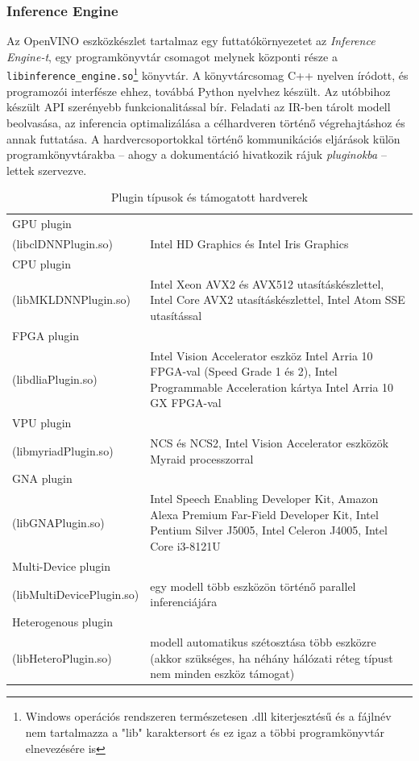 \subsubsection{Inference Engine}
Az OpenVINO eszközkészlet tartalmaz egy futtatókörnyezetet az \emph{Inference Engine-t}, egy programkönyvtár csomagot melynek központi része a \verb|libinference_engine.so|\footnote{Windows operációs rendszeren természetesen .dll kiterjesztésű és a fájlnév nem tartalmazza a "lib" karaktersort és ez igaz a többi programkönyvtár elnevezésére is} könyvtár. A könyvtárcsomag C++ nyelven íródott, és programozói interfésze ehhez, továbbá Python nyelvhez készült. Az utóbbihoz készült API szerényebb funkcionalitással bír. Feladati az IR-ben tárolt modell beolvasása, az inferencia optimalizálása a célhardveren történő végrehajtáshoz  és annak futtatása. A hardvercsoportokkal történő kommunikációs eljárások külön programkönyvtárakba -- ahogy a dokumentáció hivatkozik rájuk \emph{pluginokba} -- lettek szervezve.
\begin{table}[h]
	\centering
	\begin{tabular}{ p{} | p{} }
		GPU plugin\\(libclDNNPlugin.so)& Intel HD Graphics és Intel Iris Graphics  \\ \hline
		CPU plugin\\(libMKLDNNPlugin.so)& Intel Xeon AVX2 és AVX512 utasításkészlettel, Intel Core AVX2 utasításkészlettel, Intel Atom SSE utasítással \\ \hline
		FPGA plugin\\(libdliaPlugin.so)& Intel Vision Accelerator %
		eszköz Intel Arria 10 FPGA-val (Speed Grade 1 és 2), Intel Programmable Acceleration kártya Intel Arria 10 GX FPGA-val \\ \hline
		VPU plugin\\(libmyriadPlugin.so)& NCS és NCS2, Intel Vision Accelerator %
		eszközök Myraid processzorral\\ \hline
		GNA plugin\\(libGNAPlugin.so)& Intel Speech Enabling Developer Kit, Amazon Alexa Premium Far-Field Developer Kit, Intel Pentium Silver J5005, Intel Celeron J4005, Intel Core i3-8121U \\ \hline
		Multi-Device plugin\\(libMultiDevicePlugin.so)& egy modell több eszközön történő parallel inferenciájára\\ \hline
		Heterogenous plugin\\(libHeteroPlugin.so)& modell automatikus szétosztása több eszközre (akkor szükséges, ha néhány hálózati réteg típust nem minden eszköz támogat)
	\end{tabular}
	\caption{Plugin típusok és támogatott hardverek}
	\label{table:IEplugins}
\end{table}


